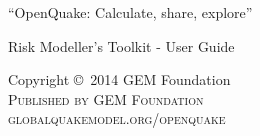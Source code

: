 %
%









\lstset{language=Python} %



\begingroup
\thispagestyle{empty}
\par\normalfont\fontsize{15}{15}\sffamily\selectfont
``OpenQuake: Calculate, share, explore''
\centering
\vspace*{9cm}
\par\normalfont\fontsize{35}{35}\sffamily\selectfont
Risk Modeller's Toolkit - User Guide\par %
\endgroup


\newpage
\vfill
\thispagestyle{empty}

\noindent Copyright \copyright\ 2014 GEM Foundation\\ %

\noindent \textsc{Published by GEM Foundation}\\ %

\noindent \textsc{globalquakemodel.org/openquake}\\ %

